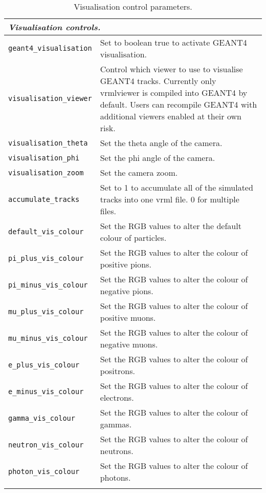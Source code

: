 \begin{table*}
\begin{center}
\caption{Visualisation control parameters.}
\begin{tabularx}{\textwidth}{lX}
\hline
\multicolumn{2}{l}{\emph{Visualisation controls.}} \\
\hline
\verb|geant4_visualisation| & Set to boolean true to activate GEANT4 visualisation.\\
\verb|visualisation_viewer| & Control which viewer to use to visualise GEANT4 tracks. Currently only vrmlviewer is compiled into GEANT4 by default. Users can recompile GEANT4 with additional viewers enabled at their own risk.\\
\verb|visualisation_theta| & Set the theta angle of the camera.\\
\verb|visualisation_phi| & Set the phi angle of the camera.\\
\verb|visualisation_zoom| & Set the camera zoom.\\
\verb|accumulate_tracks| & Set to 1 to accumulate all of the simulated tracks into one vrml file. 0 for multiple files.\\
\verb|default_vis_colour| & Set the RGB values to alter the default colour of particles.\\
\verb|pi_plus_vis_colour| & Set the RGB values to alter the colour of positive pions.\\
\verb|pi_minus_vis_colour| & Set the RGB values to alter the colour of negative pions.\\
\verb|mu_plus_vis_colour| & Set the RGB values to alter the colour of positive muons.\\
\verb|mu_minus_vis_colour| & Set the RGB values to alter the colour of negative muons.\\
\verb|e_plus_vis_colour| & Set the RGB values to alter the colour of positrons.\\
\verb|e_minus_vis_colour| & Set the RGB values to alter the colour of electrons.\\
\verb|gamma_vis_colour| & Set the RGB values to alter the colour of gammas.\\
\verb|neutron_vis_colour| & Set the RGB values to alter the colour of neutrons.\\
\verb|photon_vis_colour| & Set the RGB values to alter the colour of photons.\\
\begin{makeimage} %
\end{makeimage} 
\end{tabularx}
\end{center}
\end{table*}


